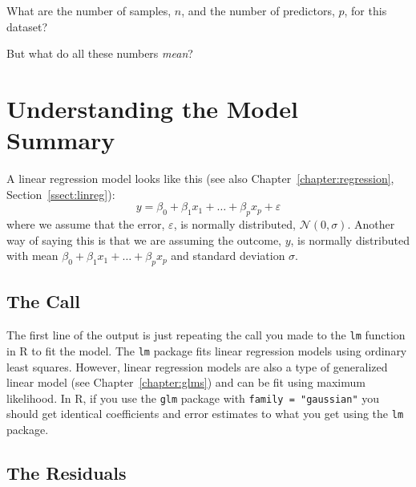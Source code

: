 \begin{question}{}
What are the number of samples, $n$, and the number of predictors, $p$, for this dataset?
\end{question}

\noindent But what do all these numbers \emph{mean}?


\section{Understanding the Model Summary}

A linear regression model looks like this (see also Chapter~\ref{chapter:regression}, Section~\ref{ssect:linreg}):
$$ y = \beta_0 + \beta_1 x_1 + \dots + \beta_p x_p + \varepsilon $$
where we assume that the error, $\varepsilon$, is normally distributed, $\mathcal{N}(0, \sigma)$. Another way of saying this is that we are assuming the outcome, $y$, is normally distributed with mean $\beta_0 + \beta_1 x_1 + \dots + \beta_p x_p$ and standard deviation $\sigma$. 

\subsection{The Call}

The first line of the output is just repeating the call you made to the \verb|lm| function in R to fit the model. The \texttt{lm} package fits linear regression models using ordinary least squares. However, linear regression models are also a type of generalized linear model (see Chapter~\ref{chapter:glms}) and can be fit using maximum likelihood. In R, if you use the \texttt{glm} package with \texttt{family = "gaussian"} you should get identical coefficients and error estimates to what you get using the \texttt{lm} package.

\subsection{The Residuals}

